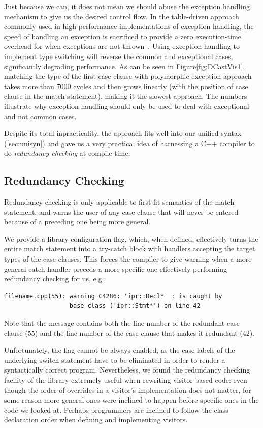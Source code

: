 \documentclass[preprint]{sigplanconf}
\begin{document}
Just because we can, it does not mean we should abuse the exception handling 
mechanism to give us the desired control flow. In the table-driven approach 
commonly used in high-performance implementations of exception handling, the 
speed of handling an exception is sacrificed to provide a zero execution-time 
overhead for when exceptions are not thrown~\cite{Schilling98}. Using exception 
handling to implement type switching will reverse the common and exceptional 
cases, significantly degrading performance. As can be seen in 
Figure\ref{fig:DCastVis1}, matching the type of the first case clause with 
polymorphic exception approach takes more than 7000 cycles and then grows 
linearly (with the position of case clause in the match statement), making it the 
slowest approach. The numbers illustrate why exception handling should only be 
used to deal with exceptional and not common cases.

Despite its total inpracticality, the approach fits well into our unified syntax 
(\textsection\ref{sec:unisyn}) and gave us a very practical idea of harnessing a
C++ compiler to do \emph{redundancy checking} at compile time.

\subsection{Redundancy Checking}
\label{sec:redun}

Redundancy checking is only applicable 
to first-fit semantics of the match statement, and warns the user of any 
case clause that will never be entered because of a preceding one being more 
general.

We provide a library-configuration flag, which, when defined, effectively turns 
the entire match statement into a try-catch block with handlers accepting the 
target types of the case clauses. This forces the compiler to give warning when 
a more general catch handler preceds a more specific one effectively performing 
redundancy checking for us, e.g.:

\begin{lstlisting}
filename.cpp(55): warning C4286: 'ipr::Decl*' : is caught by 
                  base class ('ipr::Stmt*') on line 42
\end{lstlisting}

\noindent
Note that the message contains both the line number of the redundant case clause (55) 
and the line number of the case clause that makes it redundant (42).

Unfortunately, the flag cannot be always enabled, as the case labels of the underlying 
switch statement have to be eliminated in order to render a syntactically 
correct program. Nevertheless, we found the redundancy checking facility of the 
library extremely useful when rewriting visitor-based code: even though the 
order of overrides in a visitor's implementation does not matter, for some reason 
more general ones were inclined to happen before specific ones in the code we 
looked at. Perhaps programmers are inclined to follow the class declaration order when 
defining and implementing visitors.
\end{document}
